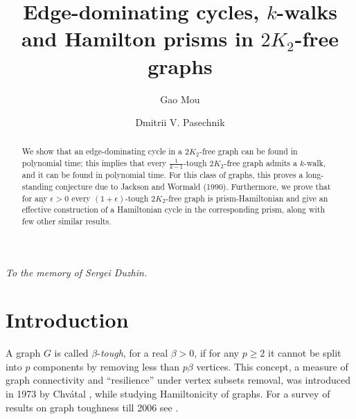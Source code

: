 \documentclass{ws-jktr}
\begin{document}

\title{Edge-dominating cycles, $k$-walks and Hamilton prisms in $2K_2$-free graphs}

\author{Gao Mou}
\address{School of Physical and Mathematical Sciences, Nanyang Technological University, Singapore,\\
\url{gaom0002@e.ntu.edu.sg}}

\author{Dmitrii V. Pasechnik}
\address{Department of Computer Science, The University of Oxford, UK,
\url{dimpase@cs.ox.ac.uk}}




\maketitle

\begin{flushright}
    \textit{To the memory of Sergei Duzhin.}
\end{flushright}

\begin{abstract}
We show that an edge-dominating cycle in a $2K_2$-free graph can be found
in polynomial time; this implies that every $\frac{1}{k-1}$-tough
$2K_2$-free graph admits a $k$-walk, and it can be found in polynomial time.
For this class of graphs, this proves a
long-standing conjecture due to Jackson and Wormald (1990).
Furthermore, we prove that for any $\epsilon>0$ every $(1+\epsilon)$-tough $2K_2$-free graph is prism-Hamiltonian
and give an effective construction of a Hamiltonian cycle in the corresponding prism,
along with few other similar results.
\end{abstract}



\section{Introduction}
A graph $G$ is called $\beta$-{\em tough}, for a real $\beta>0$, if for any $p\geq 2$ it
cannot be split into $p$ components by removing less than $p\beta$ vertices.
This concept, a measure of graph connectivity and ``resilience'' under vertex subsets removal,
was introduced in 1973 by Chv\'{a}tal \cite{chvatal1973tough},
while studying   Hamiltonicity of graphs. For a survey of results on graph toughness till 2006
see \cite{MR2221006}.
\end{document}
